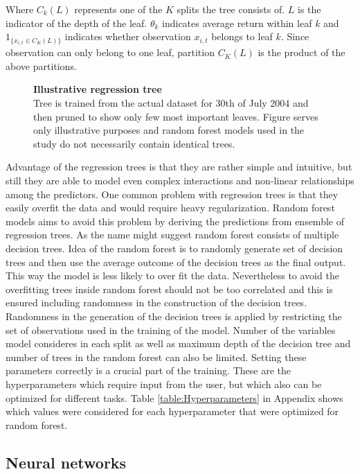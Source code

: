 \documentclass{article}
\begin{document}
Where $C_k(L)$ represents one of the $K$ splits the tree consists of. $L$ is the indicator of the depth of the leaf. $\theta_k$ indicates average return within leaf $k$ and $1 _{\{x_{i, t} \in C_K(L)\}}$ indicates whether observation $x_{i, t}$ belongs to leaf $k$. Since observation can only belong to one leaf, partition $C_K(L)$ is the product of the above partitions.

\begin{figure}[ht]
\centering
\caption[Illustrative regression tree]{\textbf{Illustrative regression tree}\\ Tree is trained from the actual dataset for 30th of July 2004 and then pruned to show only few most important leaves. Figure serves only illustrative purposes and random forest models used in the study do not necessarily contain identical trees. }

\label{plot:regre_tree}
\end{figure}

Advantage of the regression trees is that they are rather simple and intuitive, but still they are able to model even complex interactions and non-linear relationships among the predictors. One common problem with regression trees is that they easily overfit the data and would require heavy regularization. Random forest models aims to avoid this problem by deriving the predictions from ensemble of regression trees. As the name might suggest random forest consists of multiple decision trees. Idea of the random forest is to randomly generate set of decision trees and then use the average outcome of the decision trees as the final output. This way the model is less likely to over fit the data. Nevertheless to avoid the overfitting trees inside random forest should not be too correlated and this is ensured including randomness in the construction of the decision trees. Randomness in the generation of the decision trees is applied by restricting the set of observations used in the training of the model. Number of the variables model consideres in each split as well as maximum depth of the decision tree and number of trees in the random forest can also be limited. Setting these parameters correctly is a crucial part of the training. These are the hyperparameters which require input from the user, but which also can be optimized for different tasks. Table \ref{table:Hyperparameters} in Appendix shows which values were considered for each hyperparameter that were optimized for random forest.

\subsection{Neural networks}
\end{document}
